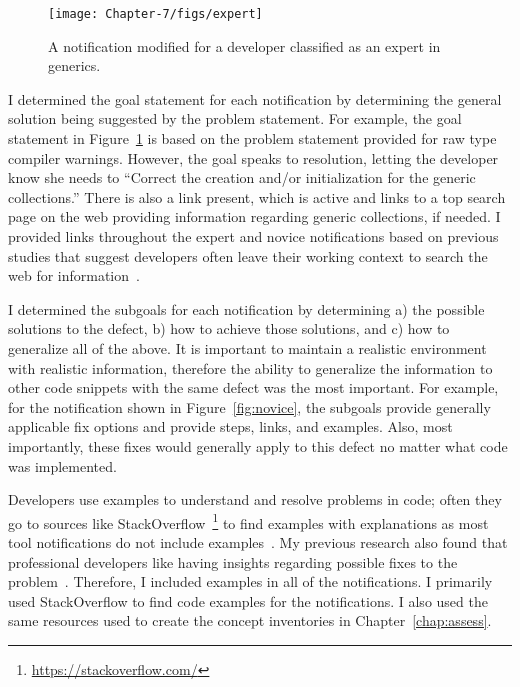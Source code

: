 \begin{figure}
	\centering
	\texttt{[image: Chapter-7/figs/expert]}
	\caption{A notification modified for a developer classified as an expert in  generics.}
	\label{fig:expert}
\end{figure}

I determined the goal statement for each notification by determining the general solution being suggested by the problem statement. For example, the goal statement in Figure~\ref{fig:expert} is based on the problem statement provided for raw type compiler warnings. However, the goal speaks to resolution, letting the developer know she needs to ``Correct the creation and/or initialization for the generic collections.'' There is also a link present, which is active and links to a top search page on the web providing information regarding generic collections, if needed.
I provided links throughout the expert and novice notifications based on previous studies that suggest developers often leave their working context to search the web for information~\cite{johnson2016cross,nasehi2012makes}.

I determined the subgoals for each notification by determining a) the possible solutions to the defect, b) how to achieve those solutions, and c) how to generalize all of the above.
It is important to maintain a realistic environment with realistic information, therefore the ability to generalize the information to other code snippets with the same defect was the most important. For example, for the notification shown in Figure~\ref{fig:novice}, the subgoals provide generally applicable fix options and provide steps, links, and examples. Also, most importantly, these fixes would generally apply to this defect no matter what code was implemented.

Developers use examples to understand and resolve problems in code; often they go to sources like StackOverflow~\footnote{\url{https://stackoverflow.com/}} to find examples with explanations as most tool notifications do not include examples~\cite{nasehi2012makes}.
My previous research also found that professional developers like having insights regarding possible fixes to the problem~\cite{johnson2013don,johnson2016cross}.
Therefore, I included examples in all of the notifications. I primarily used StackOverflow to find code examples for the notifications. I also used the same resources used to create the concept inventories in Chapter~\ref{chap:assess}.


